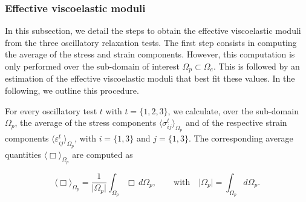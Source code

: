\documentclass[draft]{agujournal2019}
\begin{document}
\subsubsection{Effective viscoelastic moduli}
In this subsection, we detail the steps to obtain the effective viscoelastic moduli from the three oscillatory relaxation tests. The first step consists in computing the average of the  stress and strain components. However, this computation is only performed over the sub-domain of interest $\Omega_p \subset \Omega_e$. This is followed by an estimation of the effective viscoelastic moduli that best fit these values. In the following, we outline this procedure.

For every oscillatory test $t$ with $t = \{1,2,3\}$, we calculate, over the sub-domain $\Omega_p$, the average  of the stress components $\langle \sigma_{ij}^t \rangle_{\Omega_p}$ and of the respective strain components $\langle \varepsilon_{ij}^t \rangle_{\Omega_p}$, with $i=\{1,3\}$ and $j=\{1,3\}$. The corresponding average quantities $\langle \Box \rangle_{\Omega_p}$ are computed as
\begin{linenomath*}
\begin{equation}\label{Eq.12}
  \langle \Box \rangle_{\Omega_p} = \frac{1}{\vert \Omega_p \vert} \int_{\Omega_p} \Box \, d\Omega_p, \qquad \text{with} \quad  \vert \Omega_p \vert = \int_{\Omega_p}  d \Omega_p.
\end{equation}
\end{linenomath*}
\end{document}
